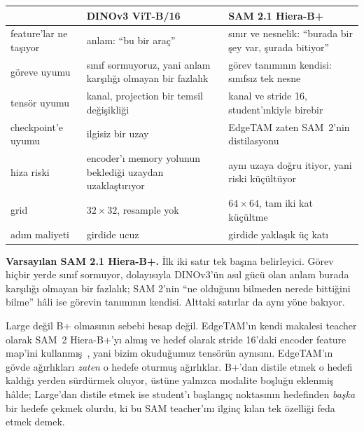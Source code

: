 \begin{center}\footnotesize
\begin{tabular}{@{}>{\raggedright\arraybackslash}p{26mm}
                  >{\raggedright\arraybackslash}p{54mm}
                  >{\raggedright\arraybackslash}p{54mm}@{}}
  \toprule
   & \textbf{DINOv3} ViT-B/16 & \textbf{SAM 2.1} Hiera-B+ \\
  \midrule
  feature'lar ne taşıyor
    & anlam: ``bu bir araç''
    & sınır ve nesnelik: ``burada bir şey var, şurada bitiyor'' \\[1.2mm]
  göreve uyumu
    & sınıf sormuyoruz, yani anlam karşılığı olmayan bir fazlalık
    & görev tanımının kendisi: sınıfsız tek nesne \\[1.2mm]
  tensör uyumu
    & 768 kanal, projection bir temsil değişikliği
    & 256 kanal ve stride 16, student'ınkiyle birebir \\[1.2mm]
  checkpoint'e uyumu
    & ilgisiz bir uzay
    & EdgeTAM zaten SAM~2'nin distilasyonu \\[1.2mm]
  hiza riski
    & encoder'ı memory yolunun beklediği uzaydan uzaklaştırıyor
    & aynı uzaya doğru itiyor, yani riski küçültüyor \\[1.2mm]
  grid
    & $32\times32$, resample yok
    & $64\times64$, tam iki kat küçültme \\[1.2mm]
  adım maliyeti
    & 512 girdide ucuz
    & 1024 girdide yaklaşık üç katı \\
  \bottomrule
\end{tabular}
\end{center}

\textbf{Varsayılan SAM 2.1 Hiera-B+.} İlk iki satır tek başına belirleyici.
Görev hiçbir yerde sınıf sormuyor, dolayısıyla DINOv3'ün asıl gücü olan
anlam burada karşılığı olmayan bir fazlalık; SAM 2'nin ``ne olduğunu
bilmeden nerede bittiğini bilme'' hâli ise görevin tanımının kendisi.
Alttaki satırlar da aynı yöne bakıyor.

Large değil B+ olmasının sebebi hesap değil. EdgeTAM'ın kendi makalesi
teacher olarak SAM~2 Hiera-B+'yı almış ve hedef olarak stride 16'daki
encoder feature map'ini kullanmış~\cite{zhou2025edgetam}, yani bizim
okuduğumuz tensörün aynısını. EdgeTAM'ın gövde ağırlıkları \emph{zaten} o
hedefe oturmuş ağırlıklar. B+'dan distile etmek o hedefi kaldığı yerden
sürdürmek oluyor, üstüne yalnızca modalite boşluğu eklenmiş hâlde;
Large'dan distile etmek ise student'ı başlangıç noktasının hedefinden
\emph{başka} bir hedefe çekmek olurdu, ki bu SAM teacher'ını ilginç kılan
tek özelliği feda etmek demek.

